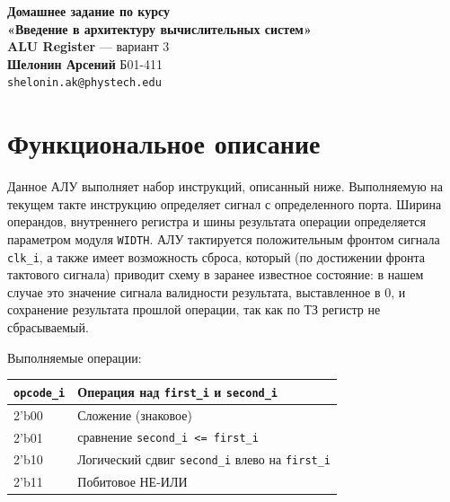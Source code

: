 

\graphicspath{{img/}}




\begin{center}
    {\Large \textbf{Домашнее задание по курсу \\ «Введение в архитектуру вычислительных систем»}} \\[0.3cm]
    {\large \textbf{ALU Register} --- вариант 3} \\[1cm]
    
    \textbf{Шелонин Арсений} Б01-411 \\
    \texttt{shelonin.ak@phystech.edu}
\end{center}

\tableofcontents
\newpage

\section{Функциональное описание}

Данное АЛУ выполняет набор инструкций, описанный ниже. Выполняемую на текущем такте инструкцию определяет сигнал с определенного порта. Ширина операндов, внутреннего регистра и шины результата операции определяется параметром модуля \texttt{WIDTH}. АЛУ тактируется положительным фронтом сигнала \texttt{clk\_i}, а также имеет возможность сброса, который (по достижении фронта тактового сигнала) приводит схему в заранее известное состояние: в нашем случае это значение сигнала валидности результата, выставленное в 0, и сохранение результата прошлой операции, так как по ТЗ регистр не сбрасываемый.  

Выполняемые операции:
\begin{table}[h!]
    \begin{tabular}{|l|l|}
        \hline
        \texttt{opcode\_i} & Операция над \texttt{first\_i} и \texttt{second\_i} \\ \hline
        2'b00              & Сложение (знаковое)                                 \\ \hline
        2'b01              & сравнение \texttt{second\_i <= first\_i}            \\ \hline
        2'b10              & Логический сдвиг \texttt{second\_i} влево на \texttt{first\_i} \\ \hline
        2'b11              & Побитовое НЕ-ИЛИ                                    \\ \hline
    \end{tabular}
\end{table}

